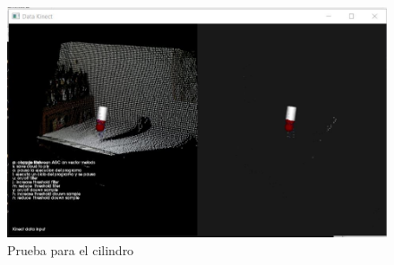 \begin{figure} [H]
	\centering
	\includegraphics[width=1\textwidth]{03Resultados/imagenes/cilindro.JPG}
	\caption{Prueba para el cilindro} 
	\label{fig:pruebaCyl}
\end{figure}















	 
	 
	 
	 
	 
	 
